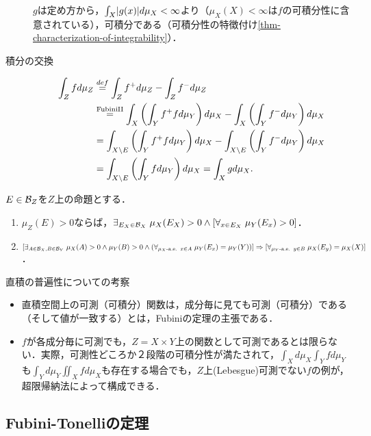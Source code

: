 \documentclass[uplatex, dvipdfmx]{jsreport}
\begin{document}
\begin{Proof}
\begin{description}
        $g$は定め方から，$\int_X\lvert g(x)\rvert d\mu_X<\infty$より（$\mu_X(X)<\infty$は$f$の可積分性に含意されている），可積分である（可積分性の特徴付け\ref{thm-characterization-of-integrability}）．
        \item[積分の交換]
        \begin{align*}
            \int_Zfd\mu_Z&\overset{def}{=}\int_Zf^+d\mu_Z-\int_Zf^-d\mu_Z\\
            &\overset{\mathrm{Fubini II}}{=}\int_X\left(\int_Yf^+fd\mu_Y\right)d\mu_X-\int_X\left(\int_Yf^-d\mu_Y\right)d\mu_X\\
            &=\int_{X\setminus E}\left(\int_Yf^+fd\mu_Y\right)d\mu_X-\int_{X\setminus E}\left(\int_Yf^-d\mu_Y\right)d\mu_X\\
            &=\int_{X\setminus E}\left(\int_Yfd\mu_Y\right)d\mu_X=\int_Xgd\mu_X.
        \end{align*}
    \end{description}
\end{Proof}

\begin{corollary}[Fubiniの定理の論理的解釈]
    $E\in\mathcal{B}_Z$を$Z$上の命題とする．
    \begin{enumerate}
        \item $\mu_Z(E)>0$ならば，$\exists_{E_X\in\mathcal{B}_X}\;\mu_X(E_X)>0\land[\forall_{x\in E_X}\;\mu_Y(E_x)>0]$．
        \item $[\exists_{A\in\mathcal{B}_X,B\in\mathcal{B}_Y}\;\mu_X(A)>0\land\mu_Y(B)>0\land(\forall_{\mu_X\textrm{-a.e.}\;\; x\in A}\;\mu_Y(E_x)=\mu_Y(Y))]\Rightarrow [\forall_{\mu_Y\textrm{-a.e.}\;\; y\in B}\;\mu_X(E_y)=\mu_X(X)]$．
    \end{enumerate}
\end{corollary}

\begin{itembox}[l]{直積の普遍性についての考察}
    \begin{itemize}
        \item 直積空間上の可測（可積分）関数は，成分毎に見ても可測（可積分）である（そして値が一致する）とは，Fubiniの定理の主張である．
        \item $f$が各成分毎に可測でも，$Z=X\times Y$上の関数として可測であるとは限らない．実際，可測性どころか２段階の可積分性が満たされて，$\int_Xd\mu_X\int_Yfd\mu_Y$も$\int_Yd\mu_Y\iint_Xfd\mu_X$も存在する場合でも，$Z$上(Lebesgue)可測でない$f$の例が，超限帰納法によって構成できる．
    \end{itemize}
\end{itembox}

\subsection{Fubini-Tonelliの定理}
\end{document}
